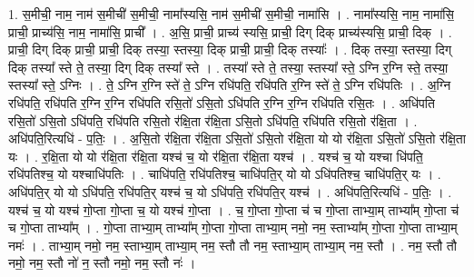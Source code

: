 \documentclass[17pt]{extarticle}
\begin{document}
1. स॒मीची॒ नाम॒ नाम॑ स॒मीची॑ स॒मीची॒ नामा᳚स्यसि॒ नाम॑ स॒मीची॑ स॒मीची॒ नामा॑सि । . नामा᳚स्यसि॒ नाम॒ नामा॑सि॒ प्राची॒ प्राच्य॑सि॒ नाम॒ नामा॑सि॒ प्राची᳚ । . अ॒सि॒ प्राची॒ प्राच्य॑ स्यसि॒ प्राची॒ दिग् दिक् प्राच्य॑स्यसि॒ प्राची॒ दिक् । . प्राची॒ दिग् दिक् प्राची॒ प्राची॒ दिक् तस्या॒ स्तस्या॒ दिक् प्राची॒ प्राची॒ दिक् तस्याः᳚ । . दिक् तस्या॒ स्तस्या॒ दिग् दिक् तस्या᳚ स्ते ते॒ तस्या॒ दिग् दिक् तस्या᳚ स्ते । . तस्या᳚ स्ते ते॒ तस्या॒ स्तस्या᳚ स्ते॒ ऽग्नि र॒ग्नि स्ते॒ तस्या॒ स्तस्या᳚ स्ते॒ ऽग्निः । . ते॒ ऽग्नि र॒ग्नि स्ते॑ ते॒ ऽग्नि रधि॑पति॒ रधि॑पति र॒ग्नि स्ते॑ ते॒ ऽग्नि रधि॑पतिः । . अ॒ग्नि रधि॑पति॒ रधि॑पति र॒ग्नि र॒ग्नि रधि॑पति रसि॒तो॑ ऽसि॒तो ऽधि॑पति र॒ग्नि र॒ग्नि रधि॑पति रसि॒तः । . अधि॑पति रसि॒तो॑ ऽसि॒तो ऽधि॑पति॒ रधि॑पति रसि॒तो र॑क्षि॒ता र॑क्षि॒ता ऽसि॒तो ऽधि॑पति॒ रधि॑पति रसि॒तो र॑क्षि॒ता । . अधि॑पति॒रित्यधि॑ - प॒तिः॒ । . अ॒सि॒तो र॑क्षि॒ता र॑क्षि॒ता ऽसि॒तो॑ ऽसि॒तो र॑क्षि॒ता यो यो र॑क्षि॒ता ऽसि॒तो॑ ऽसि॒तो र॑क्षि॒ता यः । . र॒क्षि॒ता यो यो र॑क्षि॒ता र॑क्षि॒ता यश्च॑ च॒ यो र॑क्षि॒ता र॑क्षि॒ता यश्च॑ । . यश्च॑ च॒ यो यश्चा धि॑पति॒ रधि॑पतिश्च॒ यो यश्चाधि॑पतिः । . चाधि॑पति॒ रधि॑पतिश्च॒ चाधि॑पति॒र् यो यो ऽधि॑पतिश्च॒ चाधि॑पति॒र् यः । . अधि॑पति॒र् यो यो ऽधि॑पति॒ रधि॑पति॒र् यश्च॑ च॒ यो ऽधि॑पति॒ रधि॑पति॒र् यश्च॑ । . अधि॑पति॒रित्यधि॑ - प॒तिः॒ । . यश्च॑ च॒ यो यश्च॑ गो॒प्ता गो॒प्ता च॒ यो यश्च॑ गो॒प्ता । . च॒ गो॒प्ता गो॒प्ता च॑ च गो॒प्ता ताभ्या॒म् ताभ्या᳚म् गो॒प्ता च॑ च गो॒प्ता ताभ्या᳚म् । . गो॒प्ता ताभ्या॒म् ताभ्या᳚म् गो॒प्ता गो॒प्ता ताभ्या॒म् नमो॒ नम॒ स्ताभ्या᳚म् गो॒प्ता गो॒प्ता ताभ्या॒म् नमः॑ । . ताभ्या॒म् नमो॒ नम॒ स्ताभ्या॒म् ताभ्या॒म् नम॒ स्तौ तौ नम॒ स्ताभ्या॒म् ताभ्या॒म् नम॒ स्तौ । . नम॒ स्तौ तौ नमो॒ नम॒ स्तौ नो॑ न॒ स्तौ नमो॒ नम॒ स्तौ नः॑ । \newline
\end{document}

